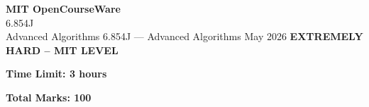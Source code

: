 \documentclass[12pt,a4paper]{exam}
\begin{document}
\begin{center}
{\LARGE \textbf{MIT OpenCourseWare}}\\6.854J\\Advanced Algorithms
\vspace{0.5cm}
{6.854J} --- {Advanced Algorithms}
\vspace{0.3cm}
May 2026
\vspace{0.3cm}
\textbf{EXTREMELY HARD -- MIT LEVEL}
\end{center}

\begin{center}
\textbf{Time Limit: 3 hours}
\end{center}

\begin{center}
\textbf{Total Marks: 100}
\end{center}

\vspace{0.5cm}
\end{document}
